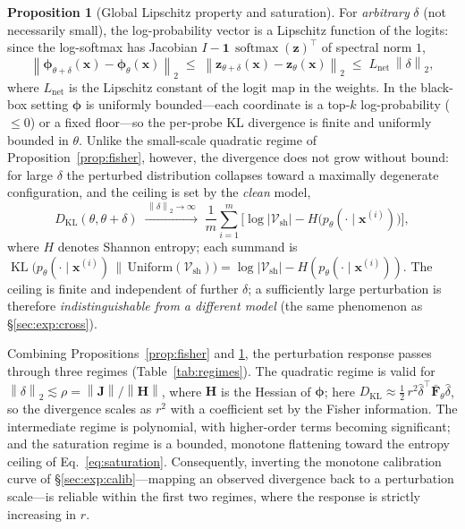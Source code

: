 \documentclass[11pt]{article}
\newcommand{\Vsh}{\mathcal{V}_{\mathrm{sh}}}
\newcommand{\norm}[1]{\left\lVert #1 \right\rVert}
\newcommand{\softmax}{\operatorname{softmax}}
\newcommand{\KL}{\operatorname{KL}}
\theoremstyle{definition}
\newtheorem{proposition}{Proposition}
\begin{document}
\begin{proposition}[Global Lipschitz property and saturation]
\label{prop:saturation}
For \emph{arbitrary} $\delta$ (not necessarily small), the log-probability
vector is a Lipschitz function of the logits: since the log-softmax has
Jacobian $I - \mathbf{1}\,\softmax(\bm{z})^\top$ of spectral norm $1$,
\begin{equation}
  \norm{\bm{\phi}_{\theta+\delta}(\bm{x}) - \bm{\phi}_\theta(\bm{x})}_2
  \;\le\; \norm{\bm{z}_{\theta+\delta}(\bm{x}) - \bm{z}_\theta(\bm{x})}_2
  \;\le\; L_{\mathrm{net}}\,\norm{\delta}_2,
  \label{eq:globlip}
\end{equation}
where $L_{\mathrm{net}}$ is the Lipschitz constant of the logit map in the
weights. In the black-box setting $\bm{\phi}$ is uniformly bounded---each
coordinate is a top-$k$ log-probability ($\le 0$) or a fixed floor---so the
per-probe KL divergence is finite and uniformly bounded in $\theta$. Unlike the
small-scale quadratic regime of Proposition~\ref{prop:fisher}, however, the
divergence does not grow without bound: for large $\delta$ the perturbed
distribution collapses toward a maximally degenerate configuration, and the
ceiling is set by the \emph{clean} model,
\begin{equation}
  D_{\mathrm{KL}}(\theta, \theta+\delta)
  \;\xrightarrow{\ \norm{\delta}_2 \to \infty\ }\;
  \frac1m \sum_{i=1}^m \Big[\log |\Vsh| - H\big(p_\theta(\cdot \mid \bm{x}^{(i)})\big)\Big],
  \label{eq:saturation}
\end{equation}
where $H$ denotes Shannon entropy; each summand is
$\KL\big(p_\theta(\cdot \mid \bm{x}^{(i)}) \,\|\, \mathrm{Uniform}(\Vsh)\big) =
\log |\Vsh| - H(p_\theta(\cdot \mid \bm{x}^{(i)}))$. The ceiling is finite and
independent of further $\delta$; a sufficiently large perturbation is therefore
\emph{indistinguishable from a different model} (the same phenomenon as
\S\ref{sec:exp:cross}).
\end{proposition}

Combining Propositions~\ref{prop:fisher} and \ref{prop:saturation}, the
perturbation response passes through three regimes
(Table~\ref{tab:regimes}). The quadratic regime is valid for
$\norm{\delta}_2 \lesssim \rho = \norm{\bm{J}}/\norm{\bm{H}}$, where $\bm{H}$
is the Hessian of $\bm{\phi}$; here
$D_{\mathrm{KL}} \approx \tfrac12\, r^2 \hat\delta^\top \bar{\bm{F}}_\theta
\hat\delta$, so the divergence scales as $r^2$ with a coefficient set by the
Fisher information. The intermediate regime is polynomial, with higher-order
terms becoming significant; and the saturation regime is a bounded, monotone
flattening toward the entropy ceiling of Eq.~\eqref{eq:saturation}.
Consequently, inverting the monotone calibration curve of
\S\ref{sec:exp:calib}---mapping an observed divergence back to a perturbation
scale---is reliable within the first two regimes, where the response is
strictly increasing in $r$.
\end{document}
